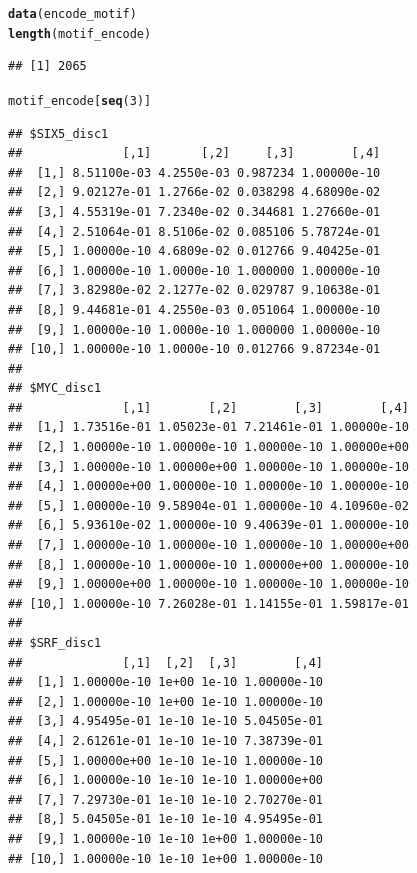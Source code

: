 \documentclass[a4paper,10pt]{article}\usepackage[]{graphicx}\usepackage[]{color}
\makeatletter
\newcommand{\hlnum}[1]{\textcolor[rgb]{0.686,0.059,0.569}{#1}}%
\newcommand{\hlstd}[1]{\textcolor[rgb]{0.345,0.345,0.345}{#1}}%
\newcommand{\hlkwd}[1]{\textcolor[rgb]{0.737,0.353,0.396}{\textbf{#1}}}%
\newenvironment{kframe}{%
 \def\at@end@of@kframe{}%
 \ifinner\ifhmode%
  \def\at@end@of@kframe{\end{minipage}}%
  \begin{minipage}{\columnwidth}%
 \fi\fi%
 \def\FrameCommand##1{\hskip\@totalleftmargin \hskip-\fboxsep
 \colorbox{shadecolor}{##1}\hskip-\fboxsep
     \hskip-\linewidth \hskip-\@totalleftmargin \hskip\columnwidth}%
 \MakeFramed {\advance\hsize-\width
   \@totalleftmargin\z@ \linewidth\hsize
   \@setminipage}}%
 {\par\unskip\endMakeFramed%
 \at@end@of@kframe}
\newenvironment{knitrout}{}{} %
\makeatother
\begin{document}
\begin{knitrout}
\color{fgcolor}\begin{kframe}
\begin{alltt}
\hlkwd{data}\hlstd{(encode_motif)}
\hlkwd{length}\hlstd{(motif_encode)}
\end{alltt}
\begin{verbatim}
## [1] 2065
\end{verbatim}
\begin{alltt}
\hlstd{motif_encode[}\hlkwd{seq}\hlstd{(}\hlnum{3}\hlstd{)]}
\end{alltt}
\begin{verbatim}
## $SIX5_disc1
##              [,1]       [,2]     [,3]        [,4]
##  [1,] 8.51100e-03 4.2550e-03 0.987234 1.00000e-10
##  [2,] 9.02127e-01 1.2766e-02 0.038298 4.68090e-02
##  [3,] 4.55319e-01 7.2340e-02 0.344681 1.27660e-01
##  [4,] 2.51064e-01 8.5106e-02 0.085106 5.78724e-01
##  [5,] 1.00000e-10 4.6809e-02 0.012766 9.40425e-01
##  [6,] 1.00000e-10 1.0000e-10 1.000000 1.00000e-10
##  [7,] 3.82980e-02 2.1277e-02 0.029787 9.10638e-01
##  [8,] 9.44681e-01 4.2550e-03 0.051064 1.00000e-10
##  [9,] 1.00000e-10 1.0000e-10 1.000000 1.00000e-10
## [10,] 1.00000e-10 1.0000e-10 0.012766 9.87234e-01
## 
## $MYC_disc1
##              [,1]        [,2]        [,3]        [,4]
##  [1,] 1.73516e-01 1.05023e-01 7.21461e-01 1.00000e-10
##  [2,] 1.00000e-10 1.00000e-10 1.00000e-10 1.00000e+00
##  [3,] 1.00000e-10 1.00000e+00 1.00000e-10 1.00000e-10
##  [4,] 1.00000e+00 1.00000e-10 1.00000e-10 1.00000e-10
##  [5,] 1.00000e-10 9.58904e-01 1.00000e-10 4.10960e-02
##  [6,] 5.93610e-02 1.00000e-10 9.40639e-01 1.00000e-10
##  [7,] 1.00000e-10 1.00000e-10 1.00000e-10 1.00000e+00
##  [8,] 1.00000e-10 1.00000e-10 1.00000e+00 1.00000e-10
##  [9,] 1.00000e+00 1.00000e-10 1.00000e-10 1.00000e-10
## [10,] 1.00000e-10 7.26028e-01 1.14155e-01 1.59817e-01
## 
## $SRF_disc1
##              [,1]  [,2]  [,3]        [,4]
##  [1,] 1.00000e-10 1e+00 1e-10 1.00000e-10
##  [2,] 1.00000e-10 1e+00 1e-10 1.00000e-10
##  [3,] 4.95495e-01 1e-10 1e-10 5.04505e-01
##  [4,] 2.61261e-01 1e-10 1e-10 7.38739e-01
##  [5,] 1.00000e+00 1e-10 1e-10 1.00000e-10
##  [6,] 1.00000e-10 1e-10 1e-10 1.00000e+00
##  [7,] 7.29730e-01 1e-10 1e-10 2.70270e-01
##  [8,] 5.04505e-01 1e-10 1e-10 4.95495e-01
##  [9,] 1.00000e-10 1e-10 1e+00 1.00000e-10
## [10,] 1.00000e-10 1e-10 1e+00 1.00000e-10
\end{verbatim}
\end{kframe}
\end{knitrout}
\end{document}
